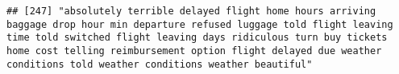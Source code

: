 \documentclass[
]{article}
\begin{document}
\begin{verbatim}
## [247] "absolutely terrible delayed flight home hours arriving baggage drop hour min departure refused luggage told flight leaving time told switched flight leaving days ridiculous turn buy tickets home cost telling reimbursement option flight delayed due weather conditions told weather conditions weather beautiful"                                                                                                                                                                                                                                                                                                                                                                                                                                                                                                                                                                                                                                                                                                                                                                                                                                                                                                                                                                                                                                                                                                                                                                                                                                                                                                                                                                                                                                                                          

\end{verbatim}
\end{document}
